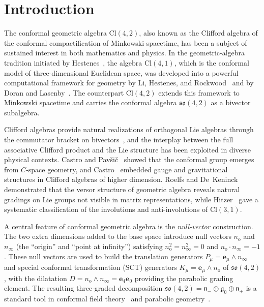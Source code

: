\documentclass{birkjour}
\theoremstyle{definition}
\theoremstyle{remark}
\numberwithin{equation}{section}
\newcommand{\Cl}{\mathrm{Cl}}
\newcommand{\so}{\mathfrak{so}}
\newcommand{\fkg}{\mathfrak{g}}
\newcommand{\fkn}{\mathfrak{n}}
\newcommand{\e}[1]{\bm{e}_{#1}}
\newcommand{\no}{n_{\mathrm{o}}}
\newcommand{\ninf}{n_{\infty}}
\begin{document}
\section{Introduction}\label{sec:intro}

The conformal geometric algebra $\Cl(4,2)$, also known as the
Clifford algebra of the conformal compactification of Minkowski
spacetime, has been a subject of sustained interest in both
mathematics and physics.
In the geometric-algebra tradition initiated by
Hestenes~\cite{HestenesSobczyk1984}, the algebra
$\Cl(4,1)$, which is the conformal model of three-dimensional
Euclidean space, was developed into a powerful computational
framework for geometry by
Li, Hestenes, and Rockwood~\cite{LiHesRock2001} and by
Doran and Lasenby~\cite{DoranLasenby2003}.
The counterpart $\Cl(4,2)$ extends this framework
to Minkowski spacetime and carries the conformal algebra
$\so(4,2)$ as a bivector subalgebra.

Clifford algebras provide natural realizations of orthogonal
Lie algebras through the commutator bracket on
bivectors~\cite{Lounesto2001}, and the interplay between the
full associative Clifford product and the Lie structure has
been exploited in diverse physical contexts.
Castro and Pav\v{s}i\v{c}~\cite{CastroPavsic2003} showed
that the conformal group emerges from $C$-space geometry,
and Castro~\cite{Castro2012} embedded gauge and gravitational
structures in Clifford algebras of higher dimension.
Roelfs and De~Keninck~\cite{Roelfs2023} demonstrated that
the versor structure of geometric algebra reveals natural
gradings on Lie groups not visible in matrix representations,
while Hitzer~\cite{Hitzer2024} gave a systematic
classification of the involutions and anti-involutions of
$\Cl(3,1)$.

A central feature of conformal geometric algebra is the
\emph{null-vector} construction.
The two extra dimensions added to the base space introduce
null vectors $\no$ and $\ninf$ (the ``origin'' and ``point at
infinity'') satisfying $\no^2=\ninf^2=0$ and
$\no\cdot\ninf=-1$.
These null vectors are used to build the translation generators
$P_\mu=\e{\mu}\wedge\ninf$ and special conformal transformation
(SCT) generators $K_\mu=\e{\mu}\wedge\no$ of $\so(4,2)$, with
the dilatation $D=\no\wedge\ninf=\e{4}\e{0}$ providing the
parabolic grading element.
The resulting three-graded decomposition
$\so(4,2)=\fkn_-\oplus\fkg_0\oplus\fkn_+$ is a standard tool
in conformal field theory~\cite{Dirac1936,Kastrup2008} and
parabolic geometry~\cite{CapSlovak2009}.
\end{document}
